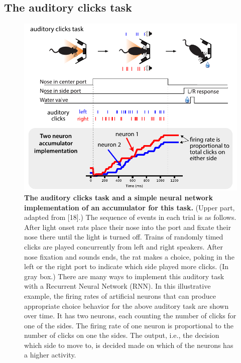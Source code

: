 \documentclass{article}
\newcounter{ct}
\theoremstyle{definition}
\theoremstyle{remark}
\begin{document}
\subsection{The auditory clicks task}
\begin{figure}[H]
    \centering
    \includegraphics{figures/task_pi_v1.pdf}
    \caption{\textbf{The auditory clicks task and a simple neural network implementation of an accumulator for this task.}
    (Upper part, adapted from [18].) %
    The sequence of events in each trial is as follows. 
    After light onset rats place their nose into the port and fixate their nose there until the light is turned off. 
    Trains of randomly timed clicks are played concurrently from left and right speakers.
    After nose fixation and sounds ends, the rat makes a choice, poking in the left or the right port to indicate which side played more clicks.
    (In gray box.) There are many ways to implement this auditory task with a Recurrent Neural Network (RNN). In this illustrative example, the firing rates of artificial neurons that can produce appropriate choice behavior for the above auditory task are shown over time. It has two neurons, each counting the number of clicks for one of the sides. The firing rate of one neuron is proportional to the number of clicks on one the sides. The output, i.e., the decision which side to move to, is decided made on which of the neurons has a higher activity.  }%
    \label{fig:task_pi_v1}
\end{figure}
\end{document}
